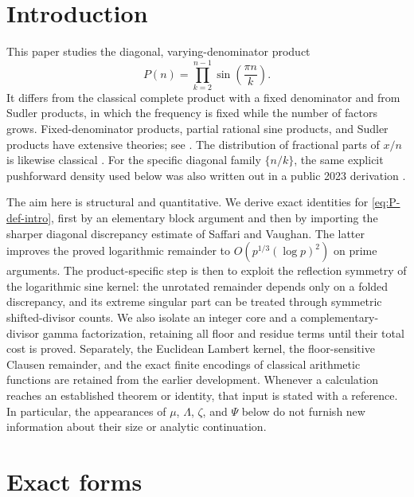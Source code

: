 \documentclass[11pt]{amsart}
\numberwithin{equation}{section}
\theoremstyle{definition}
\theoremstyle{remark}
\begin{document}
\maketitle
\tableofcontents

\section{Introduction}
\label{sec:introduction}

This paper studies the diagonal, varying-denominator product
\begin{equation}\label{eq:P-def-intro}
 P(n)=\prod_{k=2}^{n-1}\sin\!\left(\frac{\pi n}{k}\right).
\end{equation}
It differs from the classical complete product with a fixed denominator
and from Sudler products, in which the frequency is fixed while the number
of factors grows.  Fixed-denominator products, partial rational sine
products, and Sudler products have extensive theories; see
\cite{Washington1997,OSullivan2016,GrepstadEtAl2019}.  The distribution of
fractional parts of \(x/n\) is likewise classical
\cite{SaffariVaughan1977}.  For the specific diagonal family
\(\{n/k\}\), the same explicit pushforward density used below was also
written out in a public 2023 derivation \cite{MikeTeX2023}.

The aim here is structural and quantitative.  We derive exact identities
for \eqref{eq:P-def-intro}, first by an elementary block argument and then
by importing the sharper diagonal discrepancy estimate of Saffari and
Vaughan.  The latter improves the proved logarithmic remainder to
\(O(p^{1/3}(\log p)^2)\) on prime arguments.  The product-specific step is
then to exploit the reflection symmetry of the logarithmic sine kernel:
the unrotated remainder depends only on a folded discrepancy, and its
extreme singular part can be treated through symmetric shifted-divisor
counts.  We also isolate an integer core and a complementary-divisor gamma
factorization, retaining all floor and residue terms until their total cost
is proved.  Separately, the Euclidean Lambert kernel, the floor-sensitive
Clausen remainder, and the exact finite encodings of classical arithmetic
functions are retained from the earlier development.  Whenever a
calculation reaches an established theorem or identity, that input is
stated with a reference.  In particular, the appearances of \(\mu\),
\(\Lambda\), \(\zeta\), and \(\Psi\) below do not furnish new information
about their size or analytic continuation.

\section{Exact forms}
\label{sec:exact-forms}
\end{document}
